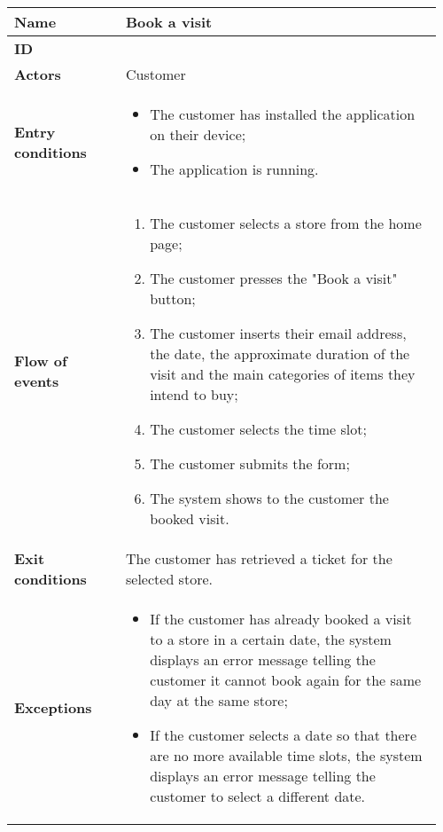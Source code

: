 	\begin{table}[H]
    	\centering
    	\begin{tabular}{@{}p{0.25\linewidth}p{0.71\linewidth}@{}}
    		\toprule
    		\textbf{Name} & Book a visit \\

    		\midrule
    		\textbf{ID} & \usecaseindex{uc:bookVisit} ~\\
    		\midrule
    		\textbf{Actors} & Customer \\
    		\midrule
    		\textbf{Entry conditions} &
    		\begin{itemize}[leftmargin=.4cm,noitemsep,topsep=0pt,before=\vspace{-3mm},after=\vspace{-4mm}]
    			\item The customer has installed the application on their device;
    			\item The application is running.
    		\end{itemize} \\
    		\midrule
    		\textbf{Flow of events} &
    		\begin{enumerate}[label=\roman*.,leftmargin=.5cm,noitemsep,topsep=0pt,before=\vspace{-3mm},after=\vspace{-4mm}]
    			\item The customer selects a store from the home page;
    			\item The customer presses the "Book a visit" button;
    			\item The customer inserts their email address, the date, the approximate duration of the visit and the main categories of items they intend to buy;
    			\item The customer selects the time slot;
                \item The customer submits the form;
                \item The system shows to the customer the booked visit.
    		\end{enumerate} \\
    		\midrule
    		\textbf{Exit conditions} & The customer has retrieved a ticket for the selected store. \\
    		\midrule
    		\textbf{Exceptions} &
            \begin{itemize}[leftmargin=.4cm,noitemsep,topsep=0pt,before=\vspace{-3mm},after=\vspace{-4mm}]
                \item If the customer has already booked a visit to a store in a certain date, the system displays an error message telling the customer it cannot book again for the same day at the same store;
                \item If the customer selects a date so that there are no more available time slots, the system displays an error message telling the customer to select a different date.
            \end{itemize} \\


\end{tabular}
\end{table}
